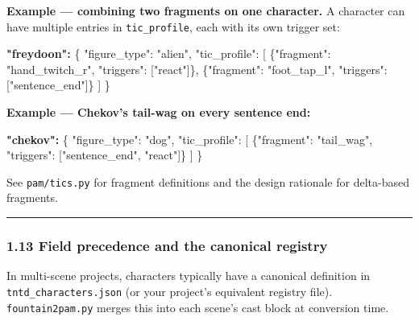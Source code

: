 \documentclass[
  12pt,
  letterpaper,
]{book}
\newenvironment{Shaded}{}{}
\newcommand{\DataTypeTok}[1]{\textcolor[rgb]{0.56,0.13,0.00}{#1}}
\newcommand{\ErrorTok}[1]{\textcolor[rgb]{1.00,0.00,0.00}{\textbf{#1}}}
\newcommand{\FunctionTok}[1]{\textcolor[rgb]{0.02,0.16,0.49}{#1}}
\newcommand{\OtherTok}[1]{\textcolor[rgb]{0.00,0.44,0.13}{#1}}
\newcommand{\StringTok}[1]{\textcolor[rgb]{0.25,0.44,0.63}{#1}}
\begin{document}
\textbf{Example --- combining two fragments on one character.} A
character can have multiple entries in \texttt{tic\_profile}, each
with its own trigger set:

\begin{Shaded}
\begin{Highlighting}[]
\ErrorTok{"freydoon":} \FunctionTok{\{}
  \DataTypeTok{"figure\_type"}\FunctionTok{:} \StringTok{"alien"}\FunctionTok{,}
  \DataTypeTok{"tic\_profile"}\FunctionTok{:} \OtherTok{[}
    \FunctionTok{\{}\DataTypeTok{"fragment"}\FunctionTok{:} \StringTok{"hand\_twitch\_r"}\FunctionTok{,} \DataTypeTok{"triggers"}\FunctionTok{:} \OtherTok{[}\StringTok{"react"}\OtherTok{]}\FunctionTok{\}}\FunctionTok{,}
    \FunctionTok{\{}\DataTypeTok{"fragment"}\FunctionTok{:} \StringTok{"foot\_tap\_l"}\FunctionTok{,} \DataTypeTok{"triggers"}\FunctionTok{:} \OtherTok{[}\StringTok{"sentence\_end"}\OtherTok{]}\FunctionTok{\}}
  \OtherTok{]}
\FunctionTok{\}}
\end{Highlighting}
\end{Shaded}

\textbf{Example --- Chekov's tail-wag on every sentence end:}

\begin{Shaded}
\begin{Highlighting}[]
\ErrorTok{"chekov":} \FunctionTok{\{}
  \DataTypeTok{"figure\_type"}\FunctionTok{:} \StringTok{"dog"}\FunctionTok{,}
  \DataTypeTok{"tic\_profile"}\FunctionTok{:} \OtherTok{[}
    \FunctionTok{\{}\DataTypeTok{"fragment"}\FunctionTok{:} \StringTok{"tail\_wag"}\FunctionTok{,} \DataTypeTok{"triggers"}\FunctionTok{:} \OtherTok{[}\StringTok{"sentence\_end"}\OtherTok{,} \StringTok{"react"}\OtherTok{]}\FunctionTok{\}}
  \OtherTok{]}
\FunctionTok{\}}
\end{Highlighting}
\end{Shaded}

See \texttt{pam/tics.py} for fragment definitions and the design
rationale for delta-based fragments.

\begin{center}\rule{0.5\linewidth}{0.5pt}\end{center}

\subsubsection{1.13 Field precedence and the canonical
registry}\label{field-precedence-and-the-canonical-registry}

In multi-scene projects, characters typically have a canonical
definition in \texttt{tntd\_characters.json} (or your project's
equivalent registry file). \texttt{fountain2pam.py} merges this into
each scene's cast block at conversion time.
\end{document}
